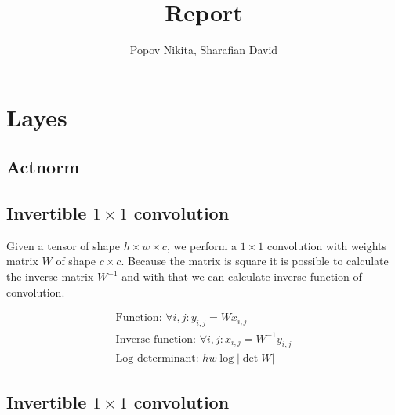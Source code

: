 \documentclass[a4paper, 12pt]{article}
\title{\textbf{Report}}
\author{Popov Nikita, Sharafian David}
\date{}
\theoremstyle{definition}
\begin{document}
	\maketitle
	
	\section{Layes}
	
	\subsection{Actnorm}
	
	
	
	\subsection{Invertible $1\times 1$ convolution}
	
	Given a tensor of shape $h \times w \times c$, we perform a $1\times 1$ convolution with weights matrix $W$ of shape $c\times c$. Because the matrix is square it is possible to calculate the inverse matrix $W^{-1}$ and with that we can calculate inverse function of convolution.
	
	\begin{align*}
	\text{Function: }\forall i, j: y_{i,j} = Wx_{i,j} \\
	\text{Inverse function: }\forall i, j: x_{i,j} = W^{-1}y_{i,j} \\
	\text{Log-determinant: } hw\log{|\det W|}
	\end{align*}
	
	\subsection{Invertible $1\times 1$ convolution}
\end{document}
